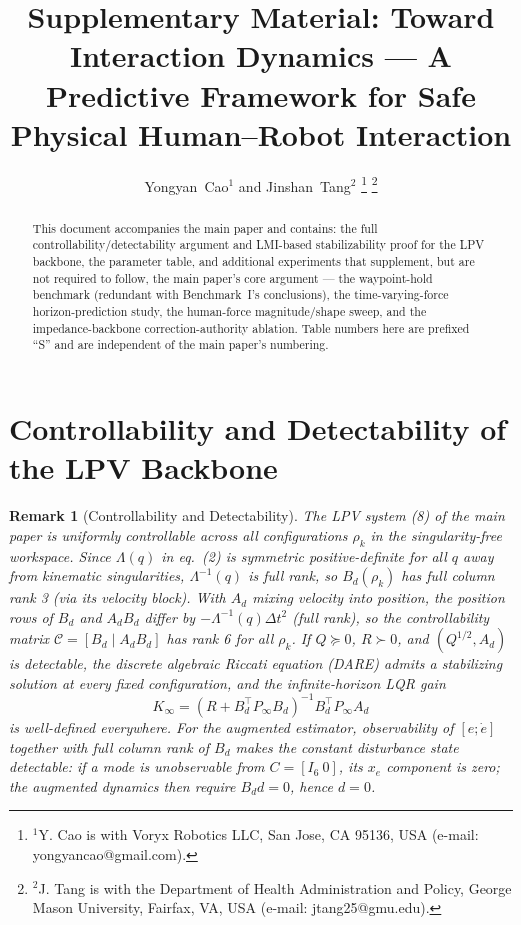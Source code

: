 \documentclass[journal]{IEEEtran}
\newtheorem{remark}{Remark}
\newcommand{\Laminv}{\Lambda^{-1}(q)}
\begin{document}
\title{Supplementary Material: Toward Interaction Dynamics --- A Predictive
Framework for Safe Physical Human–Robot Interaction}

\author{Yongyan~Cao$^{1}$ and Jinshan~Tang$^{2}$%
\thanks{$^{1}$Y. Cao is with Voryx Robotics LLC, San Jose, CA 95136, USA
(e-mail: yongyancao@gmail.com).}%
\thanks{$^{2}$J. Tang is with the Department of Health Administration and
Policy, George Mason University, Fairfax, VA, USA
(e-mail: jtang25@gmu.edu).}}

\maketitle

\begin{abstract}
This document accompanies the main paper and contains: the full
controllability/detectability argument and LMI-based stabilizability
proof for the LPV backbone, the parameter table, and additional
experiments that supplement, but are not required to follow, the main
paper's core argument --- the waypoint-hold benchmark (redundant with
Benchmark~I's conclusions), the time-varying-force horizon-prediction
study, the human-force magnitude/shape sweep, and the impedance-backbone
correction-authority ablation. Table numbers here are prefixed ``S'' and
are independent of the main paper's numbering.
\end{abstract}

\section{Controllability and Detectability of the LPV Backbone}\label{sec:controllability}

\begin{remark}[Controllability and Detectability]\label{rem:feasibility}
The LPV system (8) of the main paper is uniformly controllable across
all configurations $\rho_k$ in the singularity-free workspace. Since
$\Lambda(q)$ in eq.~(2) is symmetric positive-definite for all $q$ away
from kinematic singularities, $\Laminv$ is full rank, so $B_d(\rho_k)$
has full column rank 3 (via its velocity block). With $A_d$ mixing
velocity into position, the position rows of $B_d$ and $A_dB_d$ differ
by $-\Laminv\Delta t^2$ (full rank), so the controllability matrix
$\mathcal C=[B_d\mid A_dB_d]$ has rank 6 for all $\rho_k$. If
$Q\succeq0$, $R\succ0$, and $(Q^{1/2},A_d)$ is detectable, the discrete
algebraic Riccati equation (DARE) admits a stabilizing solution at every
fixed configuration, and the infinite-horizon LQR gain
\begin{equation*}
K_\infty=(R+B_d^\top P_\infty B_d)^{-1}B_d^\top P_\infty A_d
\end{equation*}
is well-defined everywhere. For the augmented estimator, observability
of $[e;\dot e]$ together with full column rank of $B_d$ makes the
constant disturbance state detectable: if a mode is unobservable from
$C=[I_6\ 0]$, its $x_e$ component is zero; the augmented dynamics then
require $B_dd=0$, hence $d=0$.
\end{remark}
\end{document}
